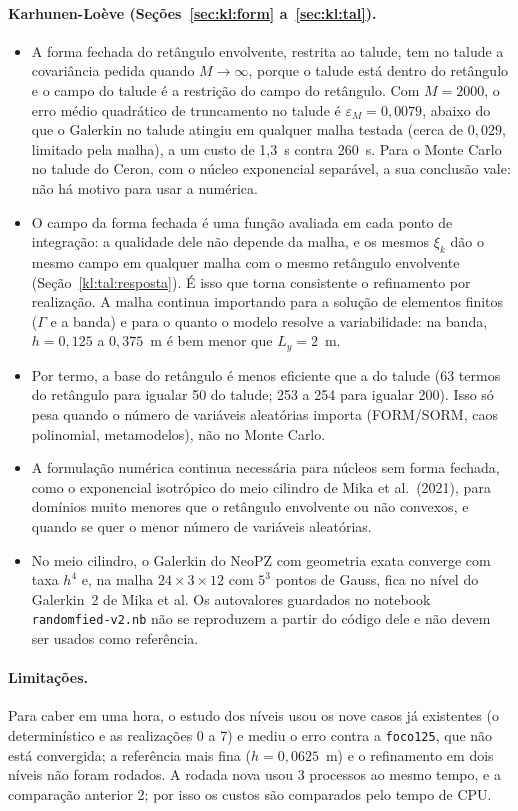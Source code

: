 \paragraph{Karhunen-Loève (Seções~\ref{sec:kl:form} a~\ref{sec:kl:tal}).}
\begin{itemize}
\item A forma fechada do retângulo envolvente, restrita ao talude, tem no talude a covariância pedida quando
  $M\to\infty$, porque o talude está dentro do retângulo e o campo do talude é a restrição do campo do retângulo. Com
  $M = 2000$, o erro médio quadrático de truncamento no talude é $\varepsilon_M = 0{,}0079$, abaixo do que o Galerkin no
  talude atingiu em qualquer malha testada (cerca de $0{,}029$, limitado pela malha), a um custo de 1,3~s contra 260~s.
  Para o Monte Carlo no talude do Ceron, com o núcleo exponencial separável, a sua conclusão vale: não há motivo para
  usar a numérica.
\item O campo da forma fechada é uma função avaliada em cada ponto de integração: a qualidade dele não depende da malha,
  e os mesmos $\xi_k$ dão o mesmo campo em qualquer malha com o mesmo retângulo envolvente
  (Seção~\ref{kl:tal:resposta}). É isso que torna consistente o refinamento por realização. A malha continua importando
  para a solução de elementos finitos ($\Gamma$ e a banda) e para o quanto o modelo resolve a variabilidade: na banda,
  $h = 0{,}125$ a $0{,}375$~m é bem menor que $L_y = 2$~m.
\item Por termo, a base do retângulo é menos eficiente que a do talude (63 termos do retângulo para igualar 50 do talude;
  253 a 254 para igualar 200). Isso só pesa quando o número de variáveis aleatórias importa (FORM/SORM, caos
  polinomial, metamodelos), não no Monte Carlo.
\item A formulação numérica continua necessária para núcleos sem forma fechada, como o exponencial isotrópico do meio
  cilindro de Mika et al.\ (2021), para domínios muito menores que o retângulo envolvente ou não convexos, e quando se
  quer o menor número de variáveis aleatórias.
\item No meio cilindro, o Galerkin do NeoPZ com geometria exata converge com taxa $h^4$ e, na malha $24\times3\times12$
  com $5^3$ pontos de Gauss, fica no nível do Galerkin~2 de Mika et al. Os autovalores guardados no notebook
  \texttt{randomfied-v2.nb} não se reproduzem a partir do código dele e não devem ser usados como referência.
\end{itemize}

\paragraph{Limitações.}
Para caber em uma hora, o estudo dos níveis usou os nove casos já existentes (o determinístico e as realizações 0 a 7)
e mediu o erro contra a \texttt{foco125}, que não está convergida; a referência mais fina ($h = 0{,}0625$~m) e o
refinamento em dois níveis não foram rodados. A rodada nova usou 3 processos ao mesmo tempo, e a comparação anterior 2;
por isso os custos são comparados pelo tempo de CPU.

